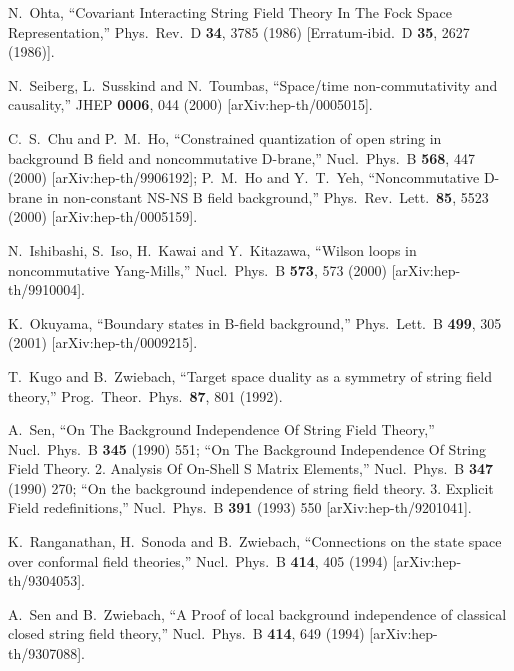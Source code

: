 \documentclass[a4paper,12pt]{article}
\begin{document}
\begin{thebibliography}{999}
N.~Ohta,
``Covariant Interacting String Field Theory 
In The Fock Space Representation,''
Phys.\ Rev.\ D {\bf 34}, 3785 (1986)
[Erratum-ibid.\ D {\bf 35}, 2627 (1986)].

N.~Seiberg, L.~Susskind and N.~Toumbas,
``Space/time non-commutativity and causality,''
JHEP {\bf 0006}, 044 (2000)
[arXiv:hep-th/0005015].

C.~S.~Chu and P.~M.~Ho,
``Constrained quantization of open string 
in background B field and  noncommutative D-brane,''
Nucl.\ Phys.\ B {\bf 568}, 447 (2000)
[arXiv:hep-th/9906192];
P.~M.~Ho and Y.~T.~Yeh,
``Noncommutative D-brane in non-constant NS-NS B field background,''
Phys.\ Rev.\ Lett.\  {\bf 85}, 5523 (2000)
[arXiv:hep-th/0005159].


N.~Ishibashi, S.~Iso, H.~Kawai and Y.~Kitazawa,
``Wilson loops in noncommutative Yang-Mills,''
Nucl.\ Phys.\ B {\bf 573}, 573 (2000)
[arXiv:hep-th/9910004].

K.~Okuyama,
``Boundary states in B-field background,''
Phys.\ Lett.\ B {\bf 499}, 305 (2001)
[arXiv:hep-th/0009215].

T.~Kugo and B.~Zwiebach,
``Target space duality as a symmetry of string field theory,''
Prog.\ Theor.\ Phys.\  {\bf 87}, 801 (1992).

A.~Sen,
``On The Background Independence Of String Field Theory,''
Nucl.\ Phys.\ B {\bf 345} (1990) 551;
``On The Background Independence Of String Field Theory. 
2. Analysis Of On-Shell S Matrix Elements,''
Nucl.\ Phys.\ B {\bf 347} (1990) 270;
``On the background independence of string field theory. 
3. Explicit Field redefinitions,''
Nucl.\ Phys.\ B {\bf 391} (1993) 550
[arXiv:hep-th/9201041].

K.~Ranganathan, H.~Sonoda and B.~Zwiebach,
``Connections on the state space over conformal field theories,''
Nucl.\ Phys.\ B {\bf 414}, 405 (1994)
[arXiv:hep-th/9304053].

A.~Sen and B.~Zwiebach,
``A Proof of local background independence of 
classical closed string field theory,''
Nucl.\ Phys.\ B {\bf 414}, 649 (1994)
[arXiv:hep-th/9307088].


\end{thebibliography}
\end{document}
